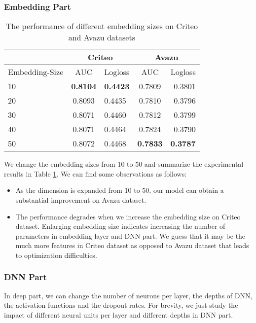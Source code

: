 \documentclass[sigconf]{acmart}
\begin{document}
\subsubsection{Embedding Part}
\begin{table}[!htp]
  \caption{The performance of different embedding sizes on
Criteo and Avazu datasets}
  \label{table:t5}
  \begin{tabular}{lclcr}
    \toprule
     &\multicolumn{2}{c}{Criteo}&\multicolumn{2}{c}{Avazu}\\
    \hline
     Embedding-Size & AUC & Logloss & AUC & Logloss\\
    \midrule
10 & \textbf{0.8104} & \textbf{0.4423} & 0.7809 & 0.3801\tabularnewline
20 & 0.8093 & 0.4435 & 0.7810 & 0.3796\tabularnewline
30 & 0.8071 & 0.4460 & 0.7812 & 0.3799\tabularnewline
40 & 0.8071 & 0.4464 & 0.7824 & 0.3790\tabularnewline
50 & 0.8072 & 0.4468 & \textbf{0.7833} & \textbf{0.3787}\tabularnewline
  \bottomrule
\end{tabular}
\end{table}
We change the embedding sizes from 10 to 50 and summarize the experimental results in Table \ref{table:t5}. We can find some observations as follows:

\begin{itemize}
\item
  As the dimension is expanded from 10 to 50, our model can obtain a substantial improvement on Avazu dataset. 
\item
  The performance degrades when we increase the embedding size on Criteo dataset. Enlarging embedding size indicates increasing the number of parameters in embedding layer and DNN part.
  We guess that it may be the much more features in Criteo dataset as opposed to Avazu dataset that leads to optimization difficulties.
\end{itemize}













\subsubsection{DNN Part}
In deep part, we can change the number of neurons per layer, the depths
of DNN, the activation functions and the dropout rates. For brevity, we
just study the impact of different neural units per layer and different depths in DNN part.
\end{document}
